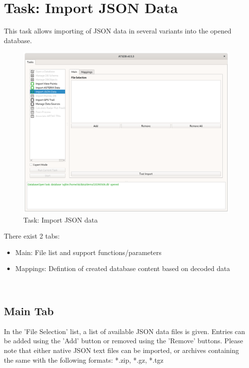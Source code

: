 \section{Task: Import JSON Data}
\label{sec:task_import_json}

This task allows importing of JSON data in several variants into the opened database. \\

\begin{figure}[H]
  \hspace*{-2.5cm}
    \includegraphics[width=19cm]{figures/import_json_data.png}
  \caption{Task: Import JSON data}
\end{figure}

There exist 2 tabs:

\begin{itemize}  
\item Main: File list and support functions/parameters
\item Mappings: Defintion of created database content based on decoded data
\end{itemize}
\ \\

\subsection{Main Tab}

In the 'File Selection' list, a list of available JSON data files is given. Entries can be added using the 'Add' button or removed using the 'Remove' buttons. Please note that either native JSON text files can be imported, or archives containing the same with the following formats: *.zip, *.gz, *.tgz \\

